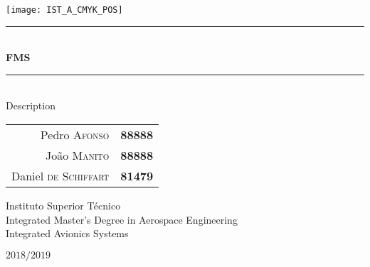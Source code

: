\documentclass{article}
\begin{document}
\thispagestyle{empty}

\texttt{[image: IST\_A\_CMYK\_POS]}
	
\begin{center}
	\vspace{40mm} %
	\rule{\linewidth}{0.5pt} \\
    \vspace{2mm}
	\Huge \textbf{FMS} \\
	\rule{\linewidth}{2pt} \\
	\vspace{8mm} %
	\Large Description
	
	\vspace{\fill} %
	
	\normalsize
	\begin{tabular}{r l}
		Pedro \textsc{Afonso} & \textbf{88888} \\
		João \textsc{Manito} & \textbf{88888} \\
		Daniel \textsc{de Schiffart} & \textbf{81479}
	\end{tabular}
	
	\vspace{10mm} %
	\Large Instituto Superior Técnico \\
	Integrated Master's Degree in Aerospace Engineering \\
	\vspace{1mm}
	\large Integrated Avionics Systems
	
	\vspace{10mm} %
	\Large $2018/2019$
\end{center}

\pagebreak
\end{document}
